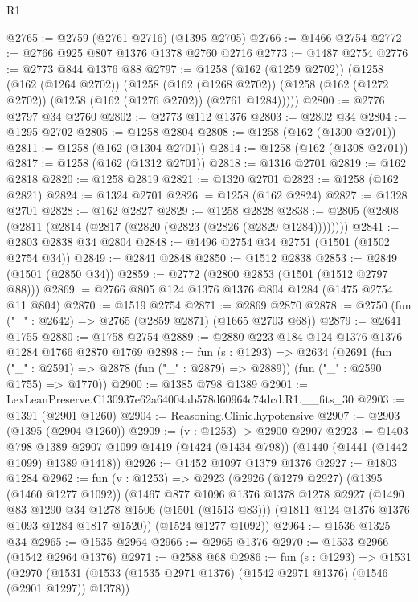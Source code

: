 \begin{lexlean}{R1}
\begin{coremodule}
@2765 := @2759 (@2761 @2716) (@1395 @2705)
@2766 := @1466 @2754
@2772 := @2766 @925 @807 @1376 @1378 @2760 @2716
@2773 := @1487 @2754
@2776 := @2773 @844 @1376 @88
@2797 := @1258
    (@162 (@1259 @2702))
    (@1258
      (@162 (@1264 @2702))
      (@1258
        (@162 (@1268 @2702))
        (@1258 (@162 (@1272 @2702)) (@1258 (@162 (@1276 @2702)) (@2761 @1284)))))
@2800 := @2776 @2797 @34 @2760
@2802 := @2773 @112 @1376
@2803 := @2802 @34
@2804 := @1295 @2702
@2805 := @1258 @2804
@2808 := @1258 (@162 (@1300 @2701))
@2811 := @1258 (@162 (@1304 @2701))
@2814 := @1258 (@162 (@1308 @2701))
@2817 := @1258 (@162 (@1312 @2701))
@2818 := @1316 @2701
@2819 := @162 @2818
@2820 := @1258 @2819
@2821 := @1320 @2701
@2823 := @1258 (@162 @2821)
@2824 := @1324 @2701
@2826 := @1258 (@162 @2824)
@2827 := @1328 @2701
@2828 := @162 @2827
@2829 := @1258 @2828
@2838 := @2805 (@2808 (@2811 (@2814 (@2817 (@2820 (@2823 (@2826 (@2829 @1284))))))))
@2841 := @2803 @2838 @34 @2804
@2848 := @1496 @2754 @34 @2751 (@1501 (@1502 @2754 @34))
@2849 := @2841 @2848
@2850 := @1512 @2838
@2853 := @2849 (@1501 (@2850 @34))
@2859 := @2772 (@2800 @2853 (@1501 (@1512 @2797 @88)))
@2869 := @2766 @805 @124 @1376 @1376 @804 @1284 (@1475 @2754 @11 @804)
@2870 := @1519 @2754
@2871 := @2869 @2870
@2878 := @2750 (fun ("_" : @2642) => @2765 (@2859 @2871) (@1665 @2703 @68))
@2879 := @2641 @1755
@2880 := @1758 @2754
@2889 := @2880 @223 @184 @124 @1376 @1376 @1284 @1766 @2870 @1769
@2898 := fun (s : @1293) =>
  @2634
    (@2691
      (fun ("_" : @2591) => @2878 (fun ("_" : @2879) => @2889))
      (fun ("_" : @2590 @1755) => @1770))
@2900 := @1385 @798 @1389
@2901 := LexLeanPreserve.C130937e62a64004ab578d60964c74dcd.R1.__fits_30
@2903 := @1391 (@2901 @1260)
@2904 := Reasoning.Clinic.hypotensive
@2907 := @2903 (@1395 (@2904 @1260))
@2909 := (v : @1253) -> @2900 @2907
@2923 := @1403
    @798
    @1389
    @2907
    @1099
    @1419
    (@1424 (@1434 @798))
    (@1440 (@1441 (@1442 @1099) @1389 @1418))
@2926 := @1452 @1097 @1379 @1376
@2927 := @1803 @1284
@2962 := fun (v : @1253) =>
  @2923
    (@2926
      (@1279 @2927)
      (@1395 (@1460 @1277 @1092))
      (@1467
        @877
        @1096
        @1376
        @1378
        @1278
        @2927
        (@1490 @83 @1290 @34 @1278 @1506 (@1501 (@1513 @83)))
        (@1811 @124 @1376 @1376 @1093 @1284 @1817 @1520))
      (@1524 @1277 @1092))
@2964 := @1536 @1325 @34
@2965 := @1535 @2964
@2966 := @2965 @1376
@2970 := @1533 @2966 (@1542 @2964 @1376)
@2971 := @2588 @68
@2986 := fun (s : @1293) =>
  @1531
    (@2970
      (@1531 (@1533 (@1535 @2971 @1376) (@1542 @2971 @1376) (@1546 (@2901 @1297)) @1378))

\end{coremodule}
\end{lexlean}
